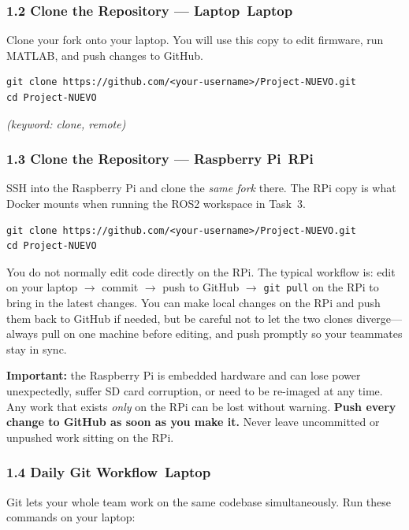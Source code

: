 \documentclass{ol-softwaremanual}
\newcommand{\onlaptop}{%
  \,\colorbox{green!25}{\footnotesize\sffamily\bfseries Laptop}}
\newcommand{\onrpi}{%
  \,\colorbox{blue!20}{\footnotesize\sffamily\bfseries RPi}}
\begin{document}
\subsubsection*{1.2 Clone the Repository — Laptop\onlaptop}

Clone your fork onto your laptop.
You will use this copy to edit firmware, run MATLAB, and push changes to GitHub.

\begin{verbatim}
git clone https://github.com/<your-username>/Project-NUEVO.git
cd Project-NUEVO
\end{verbatim}
\hfill\textit{(keyword: clone, remote)}

\subsubsection*{1.3 Clone the Repository — Raspberry Pi\onrpi}

SSH into the Raspberry Pi and clone the \emph{same fork} there.
The RPi copy is what Docker mounts when running the ROS2 workspace in Task~3.

\begin{verbatim}
git clone https://github.com/<your-username>/Project-NUEVO.git
cd Project-NUEVO
\end{verbatim}

\noindent You do not normally edit code directly on the RPi.
The typical workflow is: edit on your laptop $\to$ commit $\to$ push to GitHub
$\to$ \texttt{git pull} on the RPi to bring in the latest changes.
You can make local changes on the RPi and push them back to GitHub if needed,
but be careful not to let the two clones diverge---always pull on one machine
before editing, and push promptly so your teammates stay in sync.

\noindent\textbf{Important:} the Raspberry Pi is embedded hardware and can lose
power unexpectedly, suffer SD card corruption, or need to be re-imaged at any
time. Any work that exists \emph{only} on the RPi can be lost without warning.
\textbf{Push every change to GitHub as soon as you make it.}
Never leave uncommitted or unpushed work sitting on the RPi.

\subsubsection*{1.4 Daily Git Workflow\onlaptop}

Git lets your whole team work on the same codebase simultaneously.
Run these commands on your laptop:
\end{document}
